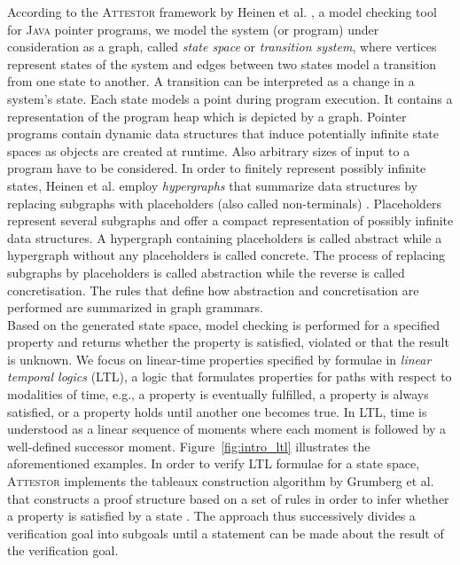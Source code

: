 \documentclass[a4paper, 12pt, twoside]{report}
\begin{document}
	According to the \textsc{Attestor} framework by Heinen et al. \cite{heinen2015juggrnaut}, a model checking tool for \textsc{Java} pointer programs, we model the system (or program) under consideration as a graph, called \textit{state space} or \textit{transition system}, where vertices represent states of the system and edges between two states model a transition from one state to another. A transition can be interpreted as a change in a system's state. Each state models a point during program execution. It contains a representation of the program heap which is depicted by a graph. Pointer programs contain dynamic data structures that induce potentially infinite state spaces as objects are created at runtime. Also arbitrary sizes of input to a program have to be considered. In order to finitely represent possibly infinite states, Heinen et al. employ \textit{hypergraphs} that summarize data structures by replacing subgraphs with placeholders (also called non-terminals) \cite{heinen2015juggrnaut}. Placeholders represent several subgraphs and offer a compact representation of possibly infinite data structures. A hypergraph containing placeholders is called abstract while a hypergraph without any placeholders is called concrete. The process of replacing subgraphs by placeholders is called abstraction while the reverse is called concretisation. The rules that define how abstraction and concretisation are performed are summarized in graph grammars.\\
	
	Based on the generated state space, model checking is performed for a specified property and returns whether the property is satisfied, violated or that the result is unknown. We focus on linear-time properties specified by formulae in \textit{linear temporal logics} (LTL), a logic that formulates properties for paths with respect to modalities of time, e.g., a property is eventually fulfilled, a property is always satisfied, or a property holds until another one becomes true. In LTL, time is understood as a linear sequence of moments where each moment is followed by a well-defined successor moment. Figure~\ref{fig:intro_ltl} illustrates the aforementioned examples. In order to verify LTL formulae for a state space, \textsc{Attestor} implements the tableaux construction algorithm by Grumberg et al. \cite{bhat1995efficient} that constructs a proof structure based on a set of rules in order to infer whether a property is satisfied by a state \cite{bhat1995efficient}. The approach thus successively divides a verification goal into subgoals until a statement can be made about the result of the verification goal.\\	
	
\end{document}
